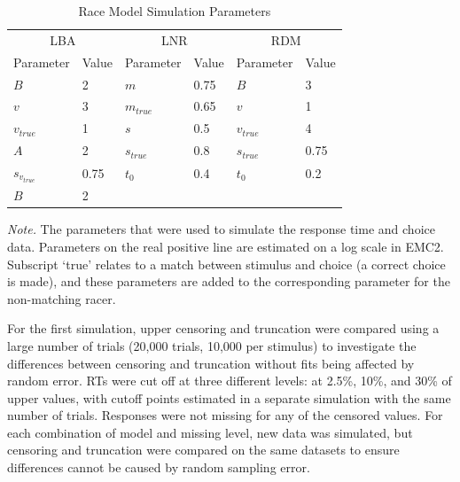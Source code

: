 \documentclass[
  stu,
  longtable,
  nolmodern,
  notxfonts,
  notimes,
  draftfirst,
  colorlinks=true,linkcolor=blue,citecolor=blue,urlcolor=blue]{apa7}
\begin{document}
\begin{table}

{\caption{{Race Model Simulation Parameters}{\label{tbl-pars}}}}

\begin{tabular}[t]{llllll}
\toprule
\multicolumn{2}{c}{LBA} & \multicolumn{2}{c}{LNR} & \multicolumn{2}{c}{RDM} \\
\cmidrule(l{3pt}r{3pt}){1-2} \cmidrule(l{3pt}r{3pt}){3-4} \cmidrule(l{3pt}r{3pt}){5-6}
\multicolumn{1}{c}{Parameter} & \multicolumn{1}{c}{Value} & \multicolumn{1}{c}{Parameter} & \multicolumn{1}{c}{Value} & \multicolumn{1}{c}{Parameter} & \multicolumn{1}{c}{Value} \\
\cmidrule(l{3pt}r{3pt}){1-1} \cmidrule(l{3pt}r{3pt}){2-2} \cmidrule(l{3pt}r{3pt}){3-3} \cmidrule(l{3pt}r{3pt}){4-4} \cmidrule(l{3pt}r{3pt}){5-5} \cmidrule(l{3pt}r{3pt}){6-6}
$B$ & 2 & $m$ & 0.75 & $B$ & 3\\
$v$ & 3 & $m_{true}$ & 0.65 & $v$ & 1\\
$v_{true}$ & 1 & $s$ & 0.5 & $v_{true}$ & 4\\
$A$ & 2 & $s_{true}$ & 0.8 & $s_{true}$ & 0.75\\
$s_{v_{true}}$ & 0.75 & $t_0$ & 0.4 & $t_0$ & 0.2\\
\addlinespace
$B$ & 2 &  &  &  & \\
\bottomrule
\end{tabular}

{\noindent \emph{Note.} The parameters that were used to simulate the
response time and choice data. Parameters on the real positive line are
estimated on a log scale in EMC2. Subscript `true' relates to a match
between stimulus and choice (a correct choice is made), and these
parameters are added to the corresponding parameter for the non-matching
racer.}

\end{table}

For the first simulation, upper censoring and truncation were compared
using a large number of trials (20,000 trials, 10,000 per stimulus) to
investigate the differences between censoring and truncation without
fits being affected by random error. RTs were cut off at three different
levels: at 2.5\%, 10\%, and 30\% of upper values, with cutoff points
estimated in a separate simulation with the same number of trials.
Responses were not missing for any of the censored values. For each
combination of model and missing level, new data was simulated, but
censoring and truncation were compared on the same datasets to ensure
differences cannot be caused by random sampling error.
\end{document}
